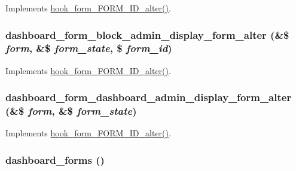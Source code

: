 \label{dashboard_8module_abc9f64b9c3b100c4e0e4450cc8c50bf0}
Implements \hyperlink{group__hooks_ga8d4a4089551493d55911bd5c4f218264}{hook\_\-form\_\-FORM\_\-ID\_\-alter()}. \hypertarget{dashboard_8module_a27b951de6a5c0b090a3415492c9e15c7}{
\subsubsection[{dashboard\_\-form\_\-block\_\-admin\_\-display\_\-form\_\-alter}]{\setlength{\rightskip}{0pt plus 5cm}dashboard\_\-form\_\-block\_\-admin\_\-display\_\-form\_\-alter (\&\$ {\em form}, \/  \&\$ {\em form\_\-state}, \/  \$ {\em form\_\-id})}}
\label{dashboard_8module_a27b951de6a5c0b090a3415492c9e15c7}
Implements \hyperlink{group__hooks_ga8d4a4089551493d55911bd5c4f218264}{hook\_\-form\_\-FORM\_\-ID\_\-alter()}. \hypertarget{dashboard_8module_a51045bc5f407b9e76a6dfb9b182bad12}{
\subsubsection[{dashboard\_\-form\_\-dashboard\_\-admin\_\-display\_\-form\_\-alter}]{\setlength{\rightskip}{0pt plus 5cm}dashboard\_\-form\_\-dashboard\_\-admin\_\-display\_\-form\_\-alter (\&\$ {\em form}, \/  \&\$ {\em form\_\-state})}}
\label{dashboard_8module_a51045bc5f407b9e76a6dfb9b182bad12}
Implements \hyperlink{group__hooks_ga8d4a4089551493d55911bd5c4f218264}{hook\_\-form\_\-FORM\_\-ID\_\-alter()}. \hypertarget{dashboard_8module_ac9d916ce89f60f399c96ace265743115}{
\subsubsection[{dashboard\_\-forms}]{\setlength{\rightskip}{0pt plus 5cm}dashboard\_\-forms ()}}

